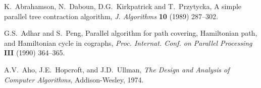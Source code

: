 
\frenchspacing
\begin{thebibliography}{99}

K.~Abrahamson, N.~Daboun, D.G.~Kirkpatrick and T.~Przytycka, A
simple parallel tree contraction algorithm, {\it J. Algorithms}
{\bf 10} (1989) 287--302.

G.S.~Adhar and S.~Peng, Parallel algorithm for path covering,
Hamiltonian path, and Hamiltonian cycle in cographs, {\it Proc.
Internat. Conf. on Parallel Processing} {\bf III} (1990) 364--365.

A.V.~Aho, J.E.~Hopcroft, and J.D.~Ullman, {\it The Design and
Analysis of Computer Algorithms}, Addison-Wesley, 1974.


\end{thebibliography}

